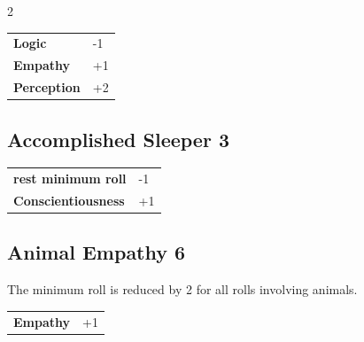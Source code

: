 \begin{multicols}{2}
\begin{tcolorbox}
\vspace{3mm}

\begin{tabular}{@{}ll@{}}
    \textbf{Logic} & -1\\
    \textbf{Empathy} & +1\\
    \textbf{Perception} & +2\\
\end{tabular}


\end{tcolorbox}

\begin{tcolorbox}
    \subsection*{Accomplished Sleeper \hfill \small{3 }}
    \tcblower




\begin{tabular}{@{}ll@{}}
    \textbf{rest minimum roll} & -1\\
    \textbf{Conscientiousness} & +1\\
\end{tabular}


\end{tcolorbox}

\begin{tcolorbox}
    \subsection*{Animal Empathy \hfill \small{6 }}
    \tcblower
The minimum roll is reduced by 2 for all rolls involving animals.


\vspace{3mm}

\begin{tabular}{@{}ll@{}}
    \textbf{Empathy} & +1\\
\end{tabular}



\end{tcolorbox}
\end{multicols}
